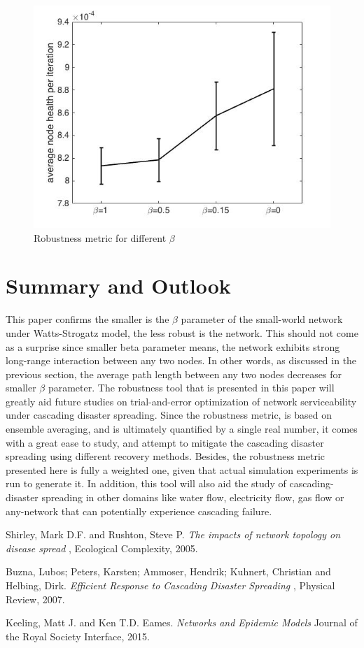 \documentclass[11pt]{article}
\begin{document}
\begin{figure}[t!]
\centering
\includegraphics[width=0.70\columnwidth]{images/periteration.jpg}
\caption{Robustness metric for different $\beta$}\label{ERROR_BAR}
\end{figure}
\clearpage

\section{Summary and Outlook}
This paper confirms the smaller is the $\beta$ parameter of the small-world network under Watts-Strogatz model, the less robust is the network. This should not come as a surprise since smaller beta parameter means, the network exhibits strong long-range interaction between any two nodes. In other words, as discussed in the previous section, the average path length between any two nodes decreases for smaller $\beta$ parameter. The robustness tool that is presented in this paper will greatly aid future studies on trial-and-error optimization of network serviceability under cascading disaster spreading. Since the robustness metric, is based on ensemble averaging, and is ultimately quantified by a single real number, it comes with a great ease to study, and attempt to mitigate the cascading disaster spreading using different recovery methods. Besides, the robustness metric presented here is fully a weighted one, given that actual simulation experiments is run to generate it. In addition, this tool will also aid the study of cascading-disaster spreading in other domains like water flow, electricity flow, gas flow or any-network that can potentially experience cascading failure.

\newpage
\begin{thebibliography}{9}
 Shirley, Mark D.F. and Rushton, Steve P. \textit{ The impacts of network topology on disease spread }, Ecological Complexity, 2005.

 Buzna, Lubos; Peters, Karsten; Ammoser, Hendrik;  Kuhnert, Christian and Helbing, Dirk.\textit{ Efficient Response to Cascading Disaster Spreading }, Physical Review, 2007.

Keeling, Matt J. and Ken T.D. Eames. \textit{ Networks and Epidemic Models } Journal of the Royal Society Interface, 2015.

\end{thebibliography}
\end{document}
